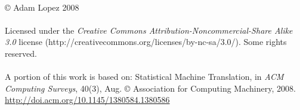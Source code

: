 
\thispagestyle{empty}
\hbox{\ }

\vfill
\small\normalsize

\vspace{-.65in}


\begin{center}
\large{\copyright{} Adam Lopez 2008\\
~\\
Licensed under the \textit{Creative Commons Attribution-Noncommercial-Share Alike 3.0} license %
(http://creativecommons.org/licenses/by-nc-sa/3.0/). %
Some rights reserved.\\
~\\
A portion of this work is based on: Statistical Machine Translation, in {\em ACM Computing Surveys}, 40(3), Aug. \copyright{} Association for Computing Machinery, 2008.  \url{http://doi.acm.org/10.1145/1380584.1380586}}
\end{center}

\vfill
